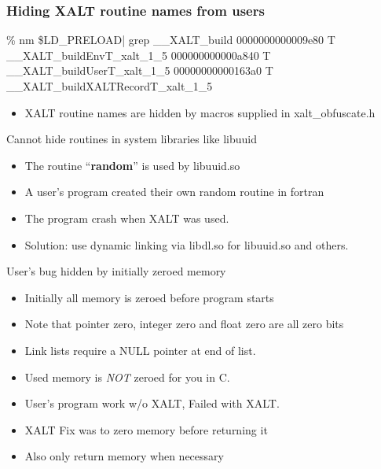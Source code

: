 \documentclass{beamer}
\begin{document}
\begin{frame}[fragile]
    \frametitle{Hiding XALT routine names from users}
 {\tiny
    \begin{semiverbatim}
\% nm \$LD\_PRELOAD| grep \_\_XALT\_build
0000000000009e80 T \_\_XALT\_buildEnvT\_xalt\_1\_5
000000000000a840 T \_\_XALT\_buildUserT\_xalt\_1\_5
00000000000163a0 T \_\_XALT\_buildXALTRecordT\_xalt\_1\_5
    \end{semiverbatim}
}
  \begin{itemize}
    \item XALT routine names are hidden by macros supplied in xalt\_obfuscate.h
  \end{itemize}

\end{frame}


\begin{frame}{Cannot hide routines in system libraries like libuuid}
  \begin{itemize}
    \item The routine ``\textbf{random}'' is used by libuuid.so
    \item A user's program created their own random routine in fortran
    \item The program crash when XALT was used.
    \item Solution: use dynamic linking via libdl.so for libuuid.so
      and others.
  \end{itemize}
\end{frame}


\begin{frame}{User's bug hidden by initially zeroed memory}
  \begin{itemize}
    \item Initially all memory is zeroed before program starts
    \item Note that pointer zero, integer zero and float zero are all
      zero bits
    \item Link lists require a NULL pointer at end of list.
    \item Used memory is {\color{red} \emph{NOT}} zeroed for you in C.
    \item User's program work w/o XALT, Failed with XALT.
    \item XALT Fix was to zero memory before returning it
    \item Also only return memory when necessary
  \end{itemize}
\end{frame}
\end{document}
